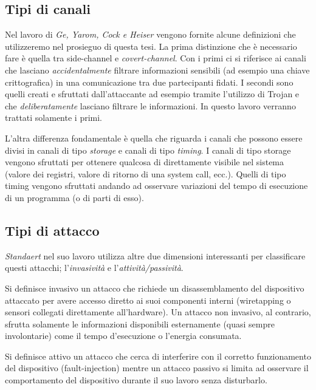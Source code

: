 		\subsection*{Tipi di canali}	
			Nel lavoro di \emph{Ge, Yarom, Cock e Heiser}\cite{ge2016survey} vengono fornite alcune definizioni che utilizzeremo nel prosieguo di questa tesi. La prima distinzione che è necessario fare è quella tra side-channel e \emph{covert-channel}. Con i primi ci si riferisce ai canali che lasciano \emph{accidentalmente} filtrare informazioni sensibili (ad esempio una chiave crittografica) in una comunicazione tra due partecipanti fidati. I secondi sono quelli creati e sfruttati dall'attaccante ad esempio tramite l'utilizzo di Trojan e che \emph{deliberatamente} lasciano filtrare le informazioni. In questo lavoro verranno trattati solamente i primi.
			
			L'altra differenza fondamentale è quella che riguarda i canali che possono essere divisi in canali di tipo \emph{storage} e canali di tipo \emph{timing}. I canali di tipo storage vengono sfruttati per ottenere qualcosa di direttamente visibile nel sistema (valore dei registri, valore di ritorno di una system call, ecc.). Quelli di tipo timing vengono sfruttati andando ad osservare variazioni del tempo di esecuzione di un programma (o di parti di esso).
			
		\subsection*{Tipi di attacco}		
			\emph{Standaert} nel suo lavoro \cite{standaert2010introduction} utilizza altre due dimensioni interessanti per classificare questi attacchi; l'\emph{invasività} e l'\emph{attività/passività}. 
			
			Si definisce invasivo un attacco che richiede un disassemblamento del dispositivo attaccato per avere accesso diretto ai suoi componenti interni (wiretapping o sensori collegati direttamente all'hardware). Un attacco non invasivo, al contrario, sfrutta solamente le informazioni disponibili esternamente (quasi sempre involontarie) come il tempo d'esecuzione o l'energia consumata.
			
			Si definisce attivo un attacco che cerca di interferire con il corretto funzionamento del dispositivo (fault-injection)\cite{giraud2004dfa,karri2001fault} mentre un attacco passivo si limita ad osservare il comportamento del dispositivo durante il suo lavoro senza disturbarlo. 
			
